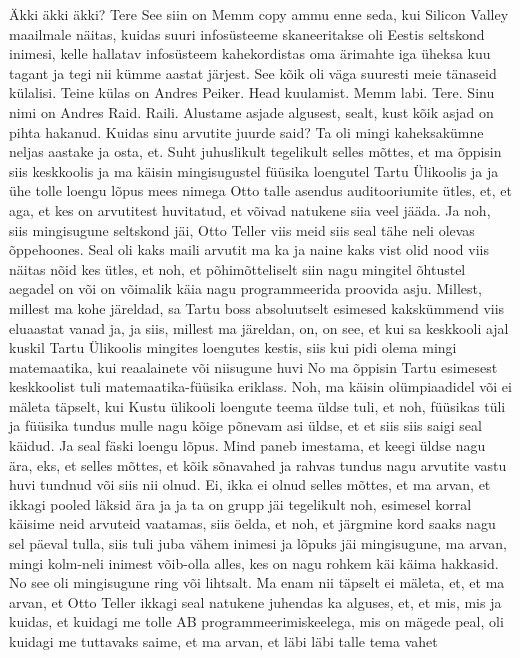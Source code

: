 
Äkki äkki äkki?
Tere See siin on Memm copy ammu enne seda, kui Silicon Valley maailmale näitas, kuidas suuri infosüsteeme skaneeritakse oli Eestis seltskond inimesi, kelle hallatav infosüsteem kahekordistas oma ärimahte iga üheksa kuu tagant ja tegi nii kümme aastat järjest. See kõik oli väga suuresti meie tänaseid külalisi. Teine külas on Andres Peiker. Head kuulamist. Memm labi.
Tere.
Sinu nimi on Andres Raid. Raili. Alustame asjade algusest, sealt, kust kõik asjad on pihta hakanud. Kuidas sinu arvutite juurde said?
Ta oli mingi kaheksakümne neljas aastake ja osta, et.
Suht juhuslikult tegelikult selles mõttes, et ma õppisin siis keskkoolis ja ma käisin mingisugustel füüsika loengutel Tartu Ülikoolis ja ja ühe tolle loengu lõpus mees nimega Otto talle asendus auditooriumite ütles, et, et aga, et kes on arvutitest huvitatud, et võivad natukene siia veel jääda. Ja noh, siis mingisugune seltskond jäi, Otto Teller viis meid siis seal tähe neli olevas õppehoones. Seal oli kaks maili arvutit ma ka ja naine kaks vist olid nood viis näitas nõid kes ütles, et noh, et põhimõtteliselt siin nagu mingitel õhtustel aegadel on või on võimalik käia nagu programmeerida proovida asju.
Millest, millest ma kohe järeldad, sa Tartu boss absoluutselt esimesed kakskümmend viis eluaastat vanad ja, ja siis, millest ma järeldan, on, on see, et kui sa keskkooli ajal kuskil Tartu Ülikoolis mingites loengutes kestis, siis kui pidi olema mingi matemaatika, kui reaalainete või niisugune huvi
No ma õppisin Tartu esimesest keskkoolist tuli matemaatika-füüsika eriklass.
Noh, ma käisin olümpiaadidel või ei mäleta täpselt, kui Kustu ülikooli loengute teema üldse tuli, et noh, füüsikas tüli ja füüsika tundus mulle nagu kõige põnevam asi üldse, et et siis siis saigi seal käidud.
Ja seal fäski loengu lõpus. Mind paneb imestama, et keegi üldse nagu ära, eks, et selles mõttes, et kõik sõnavahed ja rahvas tundus nagu arvutite vastu huvi tundnud või siis nii olnud.
Ei, ikka ei olnud selles mõttes, et ma arvan, et ikkagi pooled läksid ära ja ja ta on grupp jäi tegelikult noh, esimesel korral käisime neid arvuteid vaatamas, siis öelda, et noh, et järgmine kord saaks nagu sel päeval tulla, siis tuli juba vähem inimesi ja lõpuks jäi mingisugune, ma arvan, mingi kolm-neli inimest võib-olla alles, kes on nagu rohkem käi käima hakkasid.
No see oli mingisugune ring või lihtsalt.
Ma enam nii täpselt ei mäleta, et, et ma arvan, et Otto Teller ikkagi seal natukene juhendas ka alguses, et, et mis, mis ja kuidas, et kuidagi me tolle AB programmeerimiskeelega, mis on mägede peal, oli kuidagi me tuttavaks saime, et ma arvan, et läbi läbi talle tema vahet
